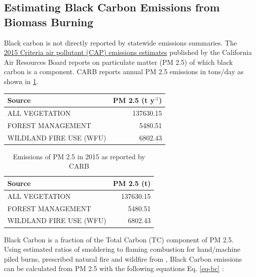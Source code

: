 \documentclass[a4paper]{article}
\begin{document}
\subsection{Estimating Black Carbon Emissions from Biomass Burning}
\label{sec-2-1}
Black carbon is not directly reported by statewide emissions summaries. The \href{http://www.arb.ca.gov/ei/emissiondata.htm}{2015 Criteria air pollutant (CAP)
emissions estimates} published by the California Air Resources Board reports on particulate matter (PM 2.5) of which black carbon is a component. CARB reports annual PM 2.5 emissions in tons/day as shown in \ref{tab:arb_pm_ann}.

\begin{center}
\begin{tabular}{lr}
Source & PM 2.5 (t y$^{\text{-1}}$)\\
\hline
ALL VEGETATION & 137630.15\\
FOREST MANAGEMENT & 5480.51\\
WILDLAND FIRE USE (WFU) & 6802.43\\
\end{tabular}
\end{center}

\begin{table}[htb]
\caption{Emissions of PM 2.5 in 2015 as reported by CARB \label{tab:arb_pm_ann}}
\centering
\begin{tabular}{lr}
Source & PM 2.5 (t)\\
\hline
ALL VEGETATION & 137630.15\\
FOREST MANAGEMENT & 5480.51\\
WILDLAND FIRE USE (WFU) & 6802.43\\
\end{tabular}
\end{table}


Black Carbon is a fraction
of the Total Carbon (TC) component of PM 2.5. Using estimated ratios of 
smoldering to flaming combustion for hand/machine piled burns, prescribed 
natural fire and wildfire from \citet{Ward1989}, Black Carbon emissions
can be calculated from PM
2.5 with the following equations Eq. \eqref{eq-bc} :
\end{document}
